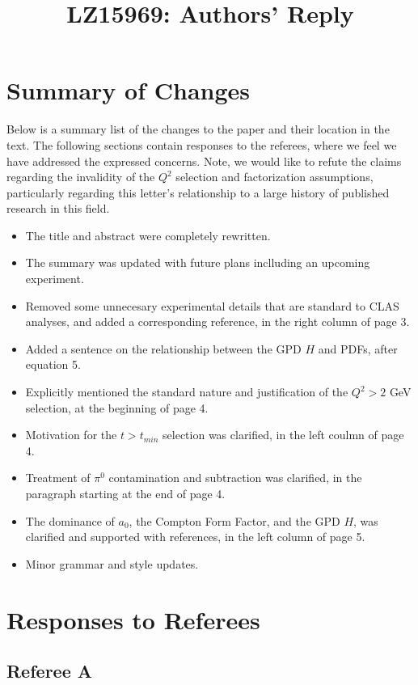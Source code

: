 \documentclass{article}
\title{LZ15969:  Authors' Reply}
\begin{document}
\maketitle

\section{Summary of Changes}
Below is a summary list of the changes to the paper and their location in the text.  The following sections contain responses to the referees, where we feel we have addressed the expressed concerns.  Note, we would like to refute the claims regarding the invalidity of the $Q^2$ selection and factorization assumptions, particularly regarding this letter's relationship to a large history of published research in this field.

\begin{itemize}
    \item{The title and abstract were completely rewritten.}
    \item{The summary was updated with future plans inclluding an upcoming experiment.}
    \item{Removed some unnecesary experimental details that are standard to CLAS analyses, and added a corresponding reference, in the right column of page 3.}
    \item{Added a sentence on the relationship between the GPD $H$ and PDFs, after equation 5.}
    \item{Explicitly mentioned the standard nature and justification of the $Q^2>2$ GeV selection, at the beginning of page 4.}
    \item{Motivation for the $t>t_{min}$ selection was clarified, in the left coulmn of page 4.}
    \item{Treatment of $\pi^0$ contamination and subtraction was clarified, in the paragraph starting at the end of page 4.}
    \item{The dominance of $a_0$, the Compton Form Factor, and the GPD $H$, was clarified and supported with references, in the left column of page 5.}
    \item{Minor grammar and style updates.}
\end{itemize}

\section{Responses to Referees}

\subsection{Referee A}
\end{document}
